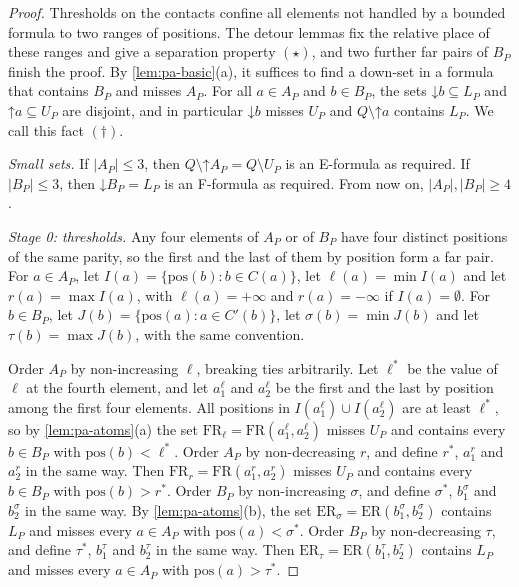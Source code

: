 \documentclass[pdflatex,sn-mathphys-num]{sn-jnl}%
\theoremstyle{thmstyleone}%
\theoremstyle{thmstyletwo}%
\theoremstyle{thmstylethree}%
\newcommand{\dn}{\mathord{\downarrow}}%
\newcommand{\upp}{\mathord{\uparrow}}%
\newcommand{\pos}{\mathrm{pos}}%
\newcommand{\FR}{\mathrm{FR}}%
\newcommand{\ER}{\mathrm{ER}}%
\begin{document}
\begin{proof}
Thresholds on the contacts confine all elements not handled by a bounded formula to two ranges of positions.
The detour lemmas fix the relative place of these ranges and give a separation property $(\star)$, and two further far pairs of $B_P$ finish the proof.
By \cref{lem:pa-basic}(a), it suffices to find a down-set in a formula that contains $B_P$ and misses $A_P$.
For all $a \in A_P$ and $b \in B_P$, the sets $\dn b \subseteq L_P$ and $\upp a \subseteq U_P$ are disjoint, and in particular $\dn b$ misses $U_P$ and $Q \setminus \upp a$ contains $L_P$.
We call this fact $(\dagger)$.

\emph{Small sets.}
If $|A_P| \leq 3$, then $Q \setminus \upp A_P = Q \setminus U_P$ is an E-formula as required.
If $|B_P| \leq 3$, then $\dn B_P = L_P$ is an F-formula as required.
From now on, $|A_P|, |B_P| \geq 4$.

\emph{Stage 0: thresholds.}
Any four elements of $A_P$ or of $B_P$ have four distinct positions of the same parity, so the first and the last of them by position form a far pair.
For $a \in A_P$, let $I(a) = \{\pos(b) : b \in C(a)\}$, let $\ell(a) = \min I(a)$ and let $r(a) = \max I(a)$, with $\ell(a) = +\infty$ and $r(a) = -\infty$ if $I(a) = \emptyset$.
For $b \in B_P$, let $J(b) = \{\pos(a) : a \in C'(b)\}$, let $\sigma(b) = \min J(b)$ and let $\tau(b) = \max J(b)$, with the same convention.

Order $A_P$ by non-increasing $\ell$, breaking ties arbitrarily.
Let $\ell^*$ be the value of $\ell$ at the fourth element, and let $a^\ell_1$ and $a^\ell_2$ be the first and the last by position among the first four elements.
All positions in $I(a^\ell_1) \cup I(a^\ell_2)$ are at least $\ell^*$, so by \cref{lem:pa-atoms}(a) the set $\FR_\ell = \FR(a^\ell_1, a^\ell_2)$ misses $U_P$ and contains every $b \in B_P$ with $\pos(b) < \ell^*$.
Order $A_P$ by non-decreasing $r$, and define $r^*$, $a^r_1$ and $a^r_2$ in the same way.
Then $\FR_r = \FR(a^r_1, a^r_2)$ misses $U_P$ and contains every $b \in B_P$ with $\pos(b) > r^*$.
Order $B_P$ by non-increasing $\sigma$, and define $\sigma^*$, $b^\sigma_1$ and $b^\sigma_2$ in the same way.
By \cref{lem:pa-atoms}(b), the set $\ER_\sigma = \ER(b^\sigma_1, b^\sigma_2)$ contains $L_P$ and misses every $a \in A_P$ with $\pos(a) < \sigma^*$.
Order $B_P$ by non-decreasing $\tau$, and define $\tau^*$, $b^\tau_1$ and $b^\tau_2$ in the same way.
Then $\ER_\tau = \ER(b^\tau_1, b^\tau_2)$ contains $L_P$ and misses every $a \in A_P$ with $\pos(a) > \tau^*$.


\end{proof}
\end{document}
